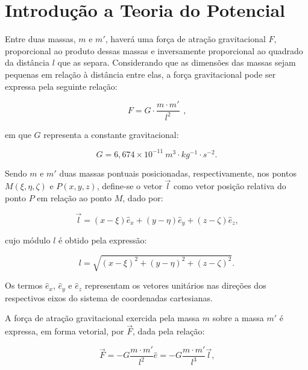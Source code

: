 \section{Introdução a Teoria do Potencial}

Entre duas massas, $m$ e $m'$, haverá uma força de atração gravitacional $F$, proporcional ao produto dessas massas e inversamente 
proporcional ao quadrado da distância $l$ que as separa. Considerando que as dimensões das massas sejam pequenas em relação à 
distância entre elas, a força gravitacional pode ser expressa pela seguinte relação:

\begin{equation}
  \label{eq_força_gravitacional}
  F = G\cdot \dfrac{m \cdot m'}{l^2} \hspace{5pt}\text{,}  
\end{equation}

\noindent
em que $G$ representa a constante gravitacional:

\begin{equation*}
  G = 6,674 \times 10^{-11}\ m^3\cdot kg^{-1}\cdot s^{-2}\text{.}  
\end{equation*}

 
Sendo $m$ e $m'$ duas massas pontuais posicionadas, respectivamente, nos pontos $M(\xi,\eta,\zeta)$ e $P(x,y,z)$, define-se o vetor
$\vec{l}$ como vetor posição relativa do ponto $P$ em relação ao ponto $M$, dado por:

\begin{equation}
  \label{eq_vetor_posicao}
  \vec{l} = (x - \xi)\hat{e}_x + (y - \eta)\hat{e}_y + (z - \zeta)\hat{e}_z \text{,}
\end{equation}

\noindent
cujo módulo $l$ é obtido pela expressão:

\begin{equation}
  \label{eq_modulo_v_p}
  l = \sqrt{(x - \xi)^2 + (y - \eta)^2 + (z - \zeta)^2} \text{.}
\end{equation}

\noindent
Os termos $\hat{e}_x$, $\hat{e}_y$ e $\hat{e}_z$ representam os vetores unitários nas direções dos respectivos eixos do sistema 
de coordenadas cartesianas. 

A força de atração gravitacional exercida pela massa $m$ sobre a massa $m'$ é expressa, em forma vetorial, por $\vec{F}$, dada 
pela relação:

\begin{equation}
  \label{eq_força_gravitacional_v}
  \vec{F} = -G \frac{m \cdot m'}{l^2} \hat{e} = -G \frac{m \cdot m'}{l^3}\vec{l}\text{,}
\end{equation}


